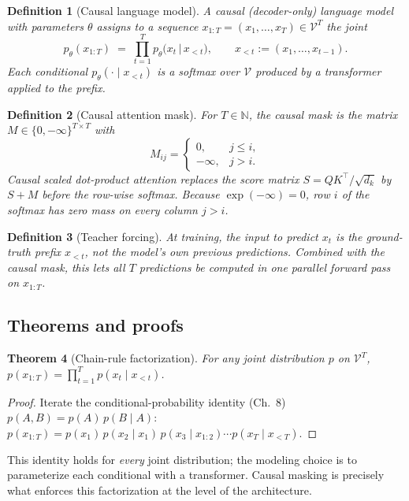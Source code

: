 \documentclass[11pt]{article}
\newtheorem{theorem}{Theorem}[section]
\newtheorem{definition}[theorem]{Definition}
\theoremstyle{remark}
\begin{document}
\begin{definition}[Causal language model]
A causal (decoder-only) language model with parameters $\theta$ assigns to a sequence $x_{1:T} = (x_1,\ldots,x_T) \in \mathcal{V}^T$ the joint
\[
  p_\theta(x_{1:T}) \;=\; \prod_{t=1}^{T} p_\theta\!\big(x_t \,\big|\, x_{<t}\big), \qquad x_{<t} := (x_1,\ldots,x_{t-1}).
\]
Each conditional $p_\theta(\cdot\mid x_{<t})$ is a softmax over $\mathcal{V}$ produced by a transformer applied to the prefix.
\end{definition}

\begin{definition}[Causal attention mask]
For $T\in\mathbb{N}$, the causal mask is the matrix $M\in\{0,-\infty\}^{T\times T}$ with
\[
  M_{ij} = \begin{cases} 0, & j \le i,\\ -\infty, & j > i.\end{cases}
\]
Causal scaled dot-product attention replaces the score matrix $S = QK^\top/\sqrt{d_k}$ by $S+M$ before the row-wise softmax. Because $\exp(-\infty)=0$, row $i$ of the softmax has zero mass on every column $j>i$.
\end{definition}

\begin{definition}[Teacher forcing]
At training, the input to predict $x_t$ is the ground-truth prefix $x_{<t}$, not the model's own previous predictions. Combined with the causal mask, this lets all $T$ predictions be computed in one parallel forward pass on $x_{1:T}$.
\end{definition}

\subsection*{Theorems and proofs}

\begin{theorem}[Chain-rule factorization]\label{thm:chain}
For any joint distribution $p$ on $\mathcal{V}^T$, $p(x_{1:T}) = \prod_{t=1}^T p(x_t \mid x_{<t})$.
\end{theorem}
\begin{proof}
Iterate the conditional-probability identity (Ch.~8) $p(A,B) = p(A)\,p(B\mid A)$:
$p(x_{1:T}) = p(x_1)\,p(x_2\mid x_1)\,p(x_3\mid x_{1:2})\cdots p(x_T\mid x_{<T})$.
\end{proof}

This identity holds for \emph{every} joint distribution; the modeling choice is to parameterize each conditional with a transformer. Causal masking is precisely what enforces this factorization at the level of the architecture.
\end{document}
